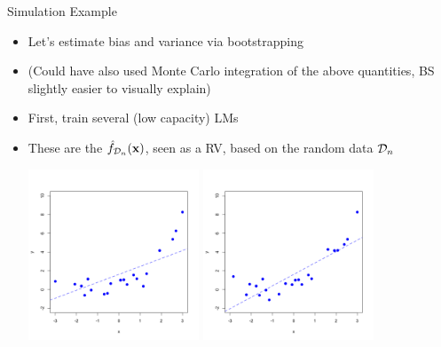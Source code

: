 \documentclass[11pt,compress,t,notes=noshow, xcolor=table]{beamer}
\begin{document}
\begin{vbframe} {Simulation Example}


\begin{itemize}
\item Let's estimate bias and variance via bootstrapping

\item (Could have also used Monte Carlo integration of the above quantities,
BS slightly easier to visually explain)

\item First, train several (low capacity) LMs
\item These are the $\hat{f}_{\mathcal{D}_n}(\mathbf{x})$, seen as a RV, based on the random
data $\mathcal{D}_n$


\begin{center}
  \includegraphics[width = 0.4\textwidth]{figure/bias_variance_decomposition-bootstrap_1.png}
  \includegraphics[width = 0.4\textwidth]{figure/bias_variance_decomposition-bootstrap_2.png}
\end{center}
\end{itemize}


\end{vbframe} 
\end{document}
